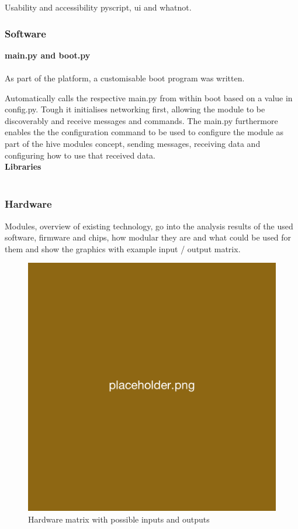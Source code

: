 Usability and accessibility
pyscript, ui and whatnot. 

\subsubsection{\label{sec:methods_sw}Software}

\textbf{\label{sec:methods_main}main.py and boot.py}\\\\
As part of the platform, a customisable boot program was written.

Automatically calls the respective main.py from within boot based on a value in config.py. Tough it initialises networking first, allowing the module to be discoverably and receive messages and commands. 
The main.py furthermore enables the the configuration command to be used to configure the module as part of the hive modules concept, sending messages, receiving data and configuring how to use that received data.\\

\textbf{\label{sec:methods_libraries}Libraries}\\\\

\subsubsection{\label{sec:methods_hw}Hardware}
Modules, overview of existing technology, go into the analysis results of the used software, firmware and chips, how modular they are and what could be used for them and show the graphics with example input / output matrix.

\begin{figure}[H]
    \centering
    \includegraphics[width=0.5\linewidth]{overleaf/images/placeholder.png}
    \vspace{\ftspace}
    \caption{Hardware matrix with possible inputs and outputs}
    \label{fig:hardware}
\end{figure}

